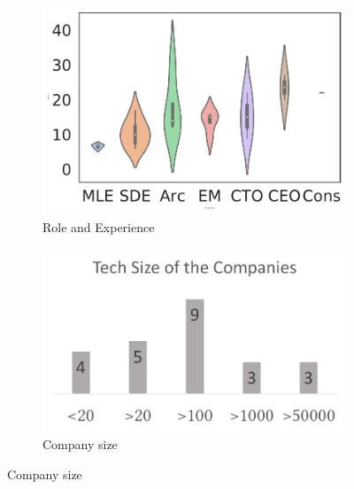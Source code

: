 
\begin{figure}%
\centering
    \begin{subfigure}[b]{0.23\textwidth}
         \centering
         \includegraphics[width=\textwidth]{images/exp.pdf}
         \caption{Role and Experience}
         \label{fig:role}
         \hfill
    \end{subfigure}
     \begin{subfigure}[b]{0.23\textwidth}
             \centering
         \includegraphics[width=\textwidth]{images/tech-size.pdf}
         \caption{Company size }
        \label{tab:company-size}
        \hfill
    \end{subfigure}


\end{figure}
